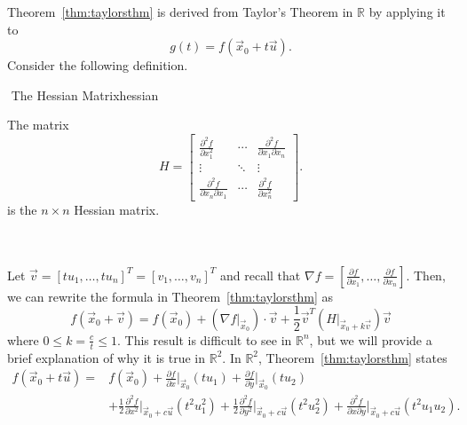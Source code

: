     Theorem~\ref{thm:taylorsthm} is derived from Taylor's Theorem in \(\mathbb{R}\) by applying it to
    \begin{equation*}
        g(t)=f(\vec{x}_0+t\vec{u}).
    \end{equation*}
    Consider the following definition.
    \begin{definition}{\Stop\,\,The Hessian Matrix}{hessian}

        The matrix
        \begin{equation*}
            H=\begin{bmatrix}
                \frac{\partial^2f}{\partial x_1^2} & \cdots & \frac{\partial^2f}{\partial x_1\partial x_n} \\
                \vdots & \ddots & \vdots \\
                \frac{\partial^2f}{\partial x_n\partial x_1} & \cdots & \frac{\partial^2f}{\partial x_n^2}
            \end{bmatrix}.
        \end{equation*}
        is the \(n\times n\) Hessian matrix.
        
    \end{definition}
    \vphantom
    \\
    \\
    Let \(\vec{v}=[tu_1,\ldots,tu_n]^T=[v_1,\ldots,v_n]^T\) and recall that \(\nabla f=\left[\frac{\partial f}{\partial x_1},\ldots,\frac{\partial f}{\partial x_n}\right]\). Then, we can rewrite the formula in Theorem~\ref{thm:taylorsthm} as
    \begin{equation*}
        f(\vec{x}_0+\vec{v})=f(\vec{x}_0)+\left(\nabla f\Big|_{\vec{x}_0}\right)\cdot\vec{v}+\frac{1}{2}\vec{v}^T\left(H\Big|_{\vec{x}_0+k\vec{v}}\right)\vec{v}
    \end{equation*}
    where \(0\leq k=\frac{c}{t}\leq 1\). This result is difficult to see in \(\mathbb{R}^n\), but we will provide a brief explanation of why it is true in \(\mathbb{R}^2\). In \(\mathbb{R}^2\), Theorem~\ref{thm:taylorsthm} states
    \begin{align*}
        f(\vec{x}_0+t\vec{u})=&f(\vec{x}_0)+\frac{\partial f}{\partial x}\Big|_{\vec{x}_0}(tu_1)+\frac{\partial f}{\partial y}\Big|_{\vec{x}_0}(tu_2)\\&+\frac{1}{2}\frac{\partial^2 f}{\partial x^2}\Big|_{\vec{x}_0+c\vec{u}}(t^2u_1^2)+\frac{1}{2}\frac{\partial^2 f}{\partial y^2}\Big|_{\vec{x}_0+c\vec{u}}(t^2u_2^2)+\frac{\partial^2f}{\partial x\partial y}\Big|_{\vec{x}_0+c\vec{u}}(t^2u_1u_2).
    \end{align*}
